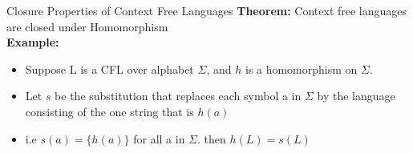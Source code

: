 \documentclass{beamer}
\begin{document}
\begin{frame}{Closure Properties of Context Free Languages}
		\textbf{Theorem:} Context free languages are closed under Homomorphism\\
		\textbf{Example:} 
	\begin{itemize}
		\item Suppose L is a CFL over alphabet $\Sigma$, and $h$ is a homomorphism on $\Sigma$.
		\item Let $s$ be the substitution that replaces each symbol a in $\Sigma$ by the language consisting of the one string that is $h(a)$
		\item i.e $ s(a)=\{h(a)\}$ for all a in $\Sigma$. then $h(L)=s(L)$
	\end{itemize}
	
\end{frame}
\end{document}

